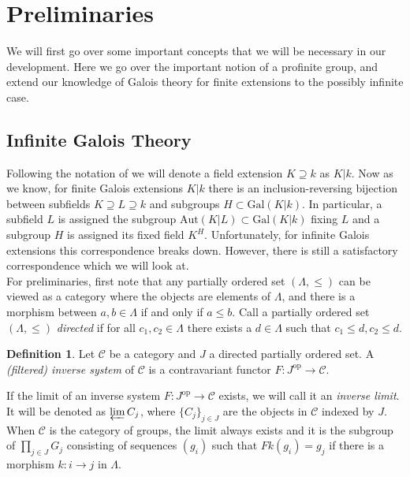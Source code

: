 \documentclass{article}
\theoremstyle{definition}
\newtheorem{definition}[theorem]{Definition}
\theoremstyle{remark}
\theoremstyle{plain}
\newcommand{\mc}[1]{\mathcal{#1}}
\begin{document}
\section{Preliminaries}
We will first go over some important concepts that we will be necessary in our development.
Here we go over the important notion of a profinite group, and extend our knowledge of Galois theory for finite extensions to the possibly infinite case.

\subsection{Infinite Galois Theory}

Following the notation of \cite{Szamuely} we will denote a field extension $K \supseteq k$ as $K|k$. 
Now as we know, for finite Galois extensions $K|k$ there is an inclusion-reversing bijection between subfields $K \supseteq L \supseteq k$ and subgroups $H \subset \text{Gal}(K|k)$.
In particular, a subfield $L$ is assigned the subgroup $\text{Aut}(K|L) \subset \text{Gal}(K|k)$ fixing $L$ and a subgroup $H$ is assigned its fixed field $K^H$.
Unfortunately, for infinite Galois extensions this correspondence breaks down.
However, there is still a satisfactory correspondence which we will look at.\\

For preliminaries, first note that any partially ordered set $(\Lambda, \leq)$ can be viewed as a category where the objects are elements of $\Lambda$, and there is a morphism between $a,b \in \Lambda$ if and only if $a \leq b$.
Call a partially ordered set $(\Lambda, \leq)$ \textit{directed} if for all $c_1, c_2 \in \Lambda$ there exists a $d \in \Lambda$ such that $c_1 \leq d, c_2 \leq d$.

\begin{definition}
	Let $\mc{C}$ be a category and $J$ a directed partially ordered set. A \textit{(filtered) inverse system} of $\mc{C}$ is a contravariant functor $F: J^{\text{op}} \to \mc{C}$.
\end{definition}

If the limit of an inverse system $F: J^{\text{op}} \to \mc{C}$ exists, we will call it an \textit{inverse limit}.
It will be denoted as $\varprojlim C_{j}$, where $\{C_j\}_{j \in J}$ are the objects in $\mc{C}$ indexed by $J$.
When $\mc{C}$ is the category of groups, the limit always exists and it is the subgroup of $\prod_{j \in J} G_j$ consisting of sequences $(g_i)$ such that $Fk(g_i) = g_j$ if there is a morphism $k: i  \to j$ in $\Lambda$.
\end{document}
